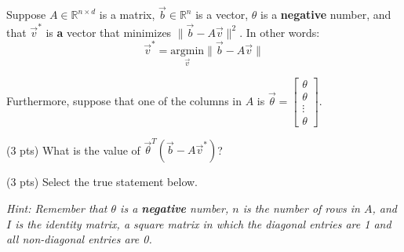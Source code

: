 \documentclass[twoside,12pt]{article}
\begin{document}
\begin{probset}
\begin{prob}[(5 pts)]
\begin{subprobset}
\begin{subprob}
\end{subprob}

\end{subprobset}

\end{prob}

\newpage

\begin{prob}[(6 pts)]

Suppose $A \in \mathbb{R}^{n \times d}$ is a matrix, $\vec b \in \mathbb{R}^n$ is a vector, $\theta$ is a \textbf{negative} number, and that $\vec v^*$ is \textbf{a} vector that minimizes $\lVert \vec b - A \vec v \rVert^2$. In other words: $$\vec v^* = \underset{\vec v}{\text{argmin}} \lVert \vec b - A \vec v \rVert$$

Furthermore, suppose that one of the columns in $A$ is $\vec \theta = \begin{bmatrix} \theta \\ \theta \\ \vdots \\ \theta\end{bmatrix}$.

\begin{subprobset}

\begin{subprob}(3 pts) What is the value of $\vec \theta^T (\vec b - A \vec v^*)$?





\bubble{$\theta$} 

\bubble{$\vec \theta$} 

    
\end{subprob}

\vspace{0.2in}

\begin{subprob}(3 pts) Select the true statement below.

\textit{Hint: Remember that $\theta$ is a \textbf{negative} number, $n$ is the number of rows in $A$, and $I$ is the identity matrix, a square matrix in which the diagonal entries are 1 and all non-diagonal entries are 0.}




\end{subprob}
\end{subprobset}
\end{prob}
\end{probset}
\end{document}

